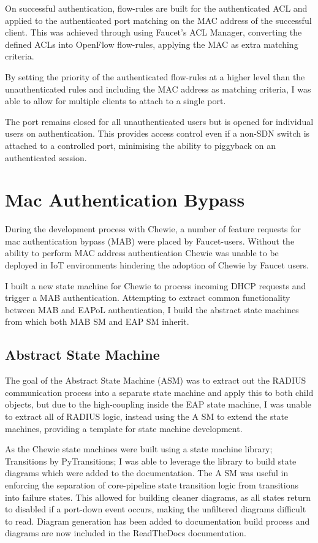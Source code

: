On successful authentication, flow-rules are built for the authenticated ACL and applied to the authenticated port matching on the MAC address of the successful client. 
This was achieved through using Faucet's ACL Manager, converting the defined ACLs into OpenFlow\cite{onf_open_flow} flow-rules, applying the MAC as extra matching criteria.

By setting the priority of the authenticated flow-rules at a higher level than the unauthenticated rules and including the MAC address as matching criteria, I was able to allow for multiple clients to attach to a single port. 

The port remains closed for all unauthenticated users but is opened for individual users on authentication. This provides access control even if a non-SDN switch is attached to a controlled port, minimising the ability to piggyback on an authenticated session.

\section{Mac Authentication Bypass}
During the development process with Chewie, a number of feature requests for mac authentication bypass (MAB) were placed by Faucet-users. Without the ability to perform MAC address authentication Chewie was unable to be deployed in IoT environments hindering the adoption of Chewie by Faucet users.

I built a new state machine for Chewie to process incoming DHCP requests and trigger a MAB authentication. Attempting to extract common functionality between MAB and EAPoL authentication, I build the abstract state machines from which both MAB SM and EAP SM inherit. 

\subsection{Abstract State Machine}
The goal of the Abstract State Machine (ASM) was to extract out the RADIUS communication process into a separate state machine and apply this to both child objects, but due to the high-coupling inside the EAP state machine, I was unable to extract all of RADIUS logic, instead using the A SM to extend the state machines, providing a template for state machine development.

As the Chewie state machines were built using a state machine library; Transitions\cite{pytransitions_github} by PyTransitions; I was able to leverage the library to build state diagrams which were added to the documentation. The A SM was useful in enforcing the separation of core-pipeline state transition logic from transitions into failure states. This allowed for building cleaner diagrams, as all states return to disabled if a port-down event occurs, making the unfiltered diagrams difficult to read. Diagram generation has been added to documentation build process and diagrams are now included in the ReadTheDocs\cite{chewie_read_the_docs} documentation.

